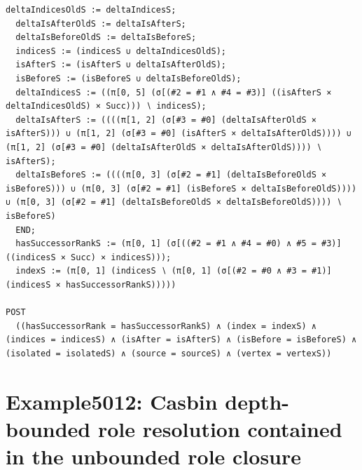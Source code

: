 \documentclass[10pt]{article}
\begin{document}
\begin{Verbatim}[fontsize=\tiny,breaklines=true,breakanywhere=true,frame=single,framesep=1.5mm]
  deltaIndicesOldS := deltaIndicesS;
  deltaIsAfterOldS := deltaIsAfterS;
  deltaIsBeforeOldS := deltaIsBeforeS;
  indicesS := (indicesS ∪ deltaIndicesOldS);
  isAfterS := (isAfterS ∪ deltaIsAfterOldS);
  isBeforeS := (isBeforeS ∪ deltaIsBeforeOldS);
  deltaIndicesS := ((π[0, 5] (σ[(#2 = #1 ∧ #4 = #3)] ((isAfterS × deltaIndicesOldS) × Succ))) ∖ indicesS);
  deltaIsAfterS := ((((π[1, 2] (σ[#3 = #0] (deltaIsAfterOldS × isAfterS))) ∪ (π[1, 2] (σ[#3 = #0] (isAfterS × deltaIsAfterOldS)))) ∪ (π[1, 2] (σ[#3 = #0] (deltaIsAfterOldS × deltaIsAfterOldS)))) ∖ isAfterS);
  deltaIsBeforeS := ((((π[0, 3] (σ[#2 = #1] (deltaIsBeforeOldS × isBeforeS))) ∪ (π[0, 3] (σ[#2 = #1] (isBeforeS × deltaIsBeforeOldS)))) ∪ (π[0, 3] (σ[#2 = #1] (deltaIsBeforeOldS × deltaIsBeforeOldS)))) ∖ isBeforeS)
  END;
  hasSuccessorRankS := (π[0, 1] (σ[((#2 = #1 ∧ #4 = #0) ∧ #5 = #3)] ((indicesS × Succ) × indicesS)));
  indexS := (π[0, 1] (indicesS ∖ (π[0, 1] (σ[(#2 = #0 ∧ #3 = #1)] (indicesS × hasSuccessorRankS)))))

POST
  ((hasSuccessorRank = hasSuccessorRankS) ∧ (index = indexS) ∧ (indices = indicesS) ∧ (isAfter = isAfterS) ∧ (isBefore = isBeforeS) ∧ (isolated = isolatedS) ∧ (source = sourceS) ∧ (vertex = vertexS))
\end{Verbatim}

\Needspace{0.45\textheight}

\section{Example5012: Casbin depth-bounded role resolution contained in the unbounded role closure}\label{case:Example5012}
\end{document}
